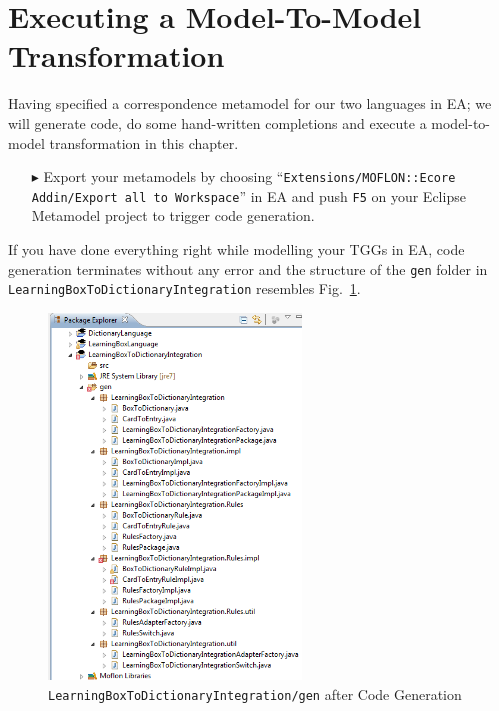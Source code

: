 \section{Executing a Model-To-Model Transformation}

Having specified a correspondence metamodel for our two languages in EA; we will generate code, do some hand-written completions and execute a model-to-model transformation in this chapter.

\begin{enumerate}
\item[$\blacktriangleright$] Export your metamodels by choosing ``\texttt{Extensions/\-MOFLON::\-Ecore Addin\-/Export all to Workspace}'' in EA and push \texttt{F5} on your Eclipse Metamodel project to trigger code generation.
\end{enumerate}

If you have done everything right while modelling your TGGs in EA, code generation terminates without any error and the structure of the \texttt{gen} folder in \texttt{LearningBox\-To\-Dictionary\-Integration} resembles Fig.~\ref{fig:gen_folder}.

\begin{figure}[htbp]
\begin{center}
  \includegraphics[width=0.6\textwidth]{pics/tggBilder/transformation/tgg22}
  \caption{\texttt{LearningBox\-To\-Dictionary\-Integration/gen} after Code Generation}  
  \label{fig:gen_folder}
\end{center}
\end{figure} 

